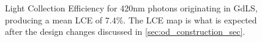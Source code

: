 \begin{figure}[!htbp]
\centering
\resizebox{\textwidth}{!}{

}
\caption[Light Collection Efficiency for 420nm photons originating in GdLS]{Light Collection Efficiency for 420nm photons originating in GdLS, producing a mean LCE of 7.4\%.
The LCE map is what is expected after the design changes discussed in \autoref{sec:od_construction_sec}.}
\label{fig:od_lce}
\end{figure}

%